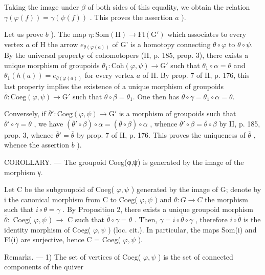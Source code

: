 Taking the image under \(\beta\) of both sides of this equality, we obtain the relation \(\gamma(\varphi(f)) = \gamma(\psi(f))\) . This proves the assertion \(a\) ).

Let us prove \(b\) ). The map \(\eta\colon\mathrm{Som}(\mathrm{H})\to\mathrm{Fl}(\mathrm{G}')\) which associates to every vertex \(a\) of H the arrow \(e_{\theta(\varphi(a))}\) of G' is a homotopy connecting \(\theta\circ\varphi\) to \(\theta\circ\psi\). By the universal property of cohomotopers (II, p. 185, prop. 3), there exists a unique morphism of groupoids \(\theta_1\colon\mathrm{Coh}(\varphi,\psi)\to\mathrm{G}'\) such that \(\theta_1\circ\alpha=\theta\) and \(\theta_1(h(a))=e_{\theta(\varphi(a))}\) for every vertex \(a\) of H. By prop. 7 of II, p. 176, this last property implies the existence of a unique morphism of groupoids \(\overline{\theta}\colon\mathrm{Coeg}(\varphi,\psi)\to\mathrm{G}'\) such that \(\overline{\theta}\circ\beta=\theta_1\). One then has \(\overline{\theta}\circ\gamma=\theta_1\circ\alpha=\theta\).

Conversely, if \(\overline{\theta}'\colon \mathrm{Coeg}(\varphi,\psi)\to \mathrm{G}'\) is a morphism of groupoids such that \(\overline{\theta}'\circ\gamma=\theta\) , we have \((\overline{\theta}'\circ\beta)\circ\alpha=(\overline{\theta}\circ\beta)\circ\alpha\) , whence \(\overline{\theta}'\circ\beta=\overline{\theta}\circ\beta\) by II, p. 185, prop. 3, whence \(\overline{\theta}'=\overline{\theta}\) by prop. 7 of II, p. 176. This proves the uniqueness of \(\overline{\theta}\) , whence the assertion \(b\) ).

COROLLARY. --- The groupoid Coeg(φ,ψ) is generated by the image of the morphism γ.

Let C be the subgroupoid of Coeg( \(\varphi,\psi\) ) generated by the image of G; denote by i the canonical morphism from C to Coeg( \(\varphi,\psi\) ) and \(\theta\colon G\to C\) the morphism such that \(i\circ\theta=\gamma\) . By Proposition 2, there exists a unique groupoid morphism \(\overline{\theta}\colon\) Coeg( \(\varphi,\psi\) ) \(\to\) C such that \(\overline{\theta}\circ\gamma=\theta\) . Then, \(\gamma=i\circ\overline{\theta}\circ\gamma\) , therefore \(i\circ\overline{\theta}\) is the identity morphism of Coeg( \(\varphi,\psi\) ) (loc. cit.). In particular, the maps Som(i) and Fl(i) are surjective, hence C = Coeg( \(\varphi,\psi\) ).

Remarks. --- 1) The set of vertices of Coeg( \(\varphi,\psi\) ) is the set of connected components of the quiver

